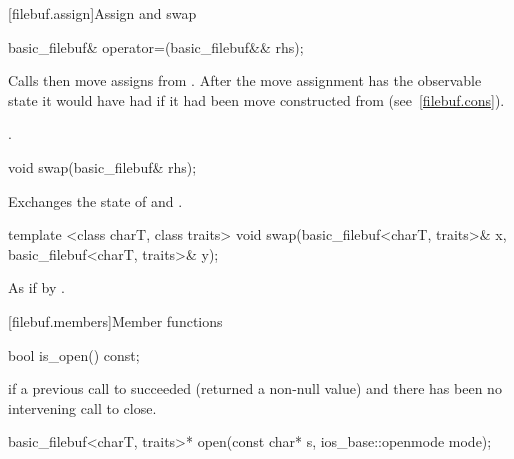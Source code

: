 [filebuf.assign]{Assign and swap}

%
\begin{itemdecl}
basic_filebuf& operator=(basic_filebuf&& rhs);
\end{itemdecl}

\begin{itemdescr}
\pnum
\effects Calls  then move assigns from . After the
move assignment  has the observable state it would have had if it
had been move constructed from  (see~\ref{filebuf.cons}).

\pnum
\returns {}.
\end{itemdescr}

%
\begin{itemdecl}
void swap(basic_filebuf& rhs);
\end{itemdecl}

\begin{itemdescr}
\pnum
\effects Exchanges the state of 
and .
\end{itemdescr}

%
\begin{itemdecl}
template <class charT, class traits>
  void swap(basic_filebuf<charT, traits>& x,
            basic_filebuf<charT, traits>& y);
\end{itemdecl}

\begin{itemdescr}
\pnum
\effects As if by .
\end{itemdescr}

[filebuf.members]{Member functions}

%
\begin{itemdecl}
bool is_open() const;
\end{itemdecl}

\begin{itemdescr}
\pnum
\returns
{}
if a previous call to
succeeded (returned a non-null value) and there has been no intervening
call to close.
\end{itemdescr}

%
\begin{itemdecl}
basic_filebuf<charT, traits>* open(const char* s,
                                   ios_base::openmode mode);
\end{itemdecl}


